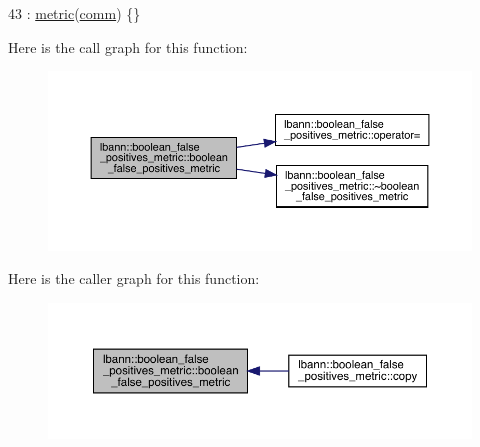 \begin{DoxyCode}
43 : \hyperlink{classlbann_1_1metric_a3cd2d4f7dcbf94f70b3b8560a3171d9d}{metric}(\hyperlink{file__io_8cpp_ab048c6f9fcbcfaa57ce68b00263dbebe}{comm}) \{\}
\end{DoxyCode}
Here is the call graph for this function\+:\nopagebreak
\begin{figure}[H]
\begin{center}
\leavevmode
\includegraphics[width=350pt]{classlbann_1_1boolean__false__positives__metric_a47a4ec4bd3cd0d895f3543cd9ee0ea9b_cgraph}
\end{center}
\end{figure}
Here is the caller graph for this function\+:\nopagebreak
\begin{figure}[H]
\begin{center}
\leavevmode
\includegraphics[width=350pt]{classlbann_1_1boolean__false__positives__metric_a47a4ec4bd3cd0d895f3543cd9ee0ea9b_icgraph}
\end{center}
\end{figure}
\mbox{\label{classlbann_1_1boolean__false__positives__metric_a2af5389995ebacebc04dc38c13f77738}} 
